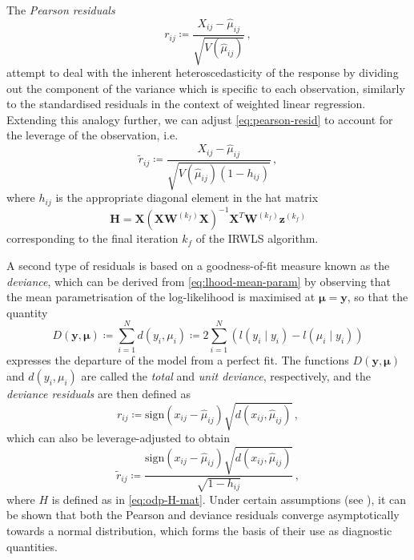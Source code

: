 \documentclass[a4paper]{book}
\begin{document}
The \emph{Pearson residuals}
\begin{equation} \label{eq:pearson-resid}
  r_{ij} \coloneqq \frac{X_{ij} - \widehat{\mu}_{ij}}{\sqrt{V(\widehat{\mu}_{ij})}} \,,
\end{equation}
attempt to deal with the inherent heteroscedasticity of the response by dividing out the component of the variance which is specific to each observation, similarly to the standardised residuals in the context of weighted linear regression. Extending this analogy further, we can adjust \cref{eq:pearson-resid} to account for the leverage of the observation, i.e.\
\begin{equation}
  \tilde{r}_{ij} \coloneqq \frac{X_{ij} - \widehat{\mu}_{ij}}{\sqrt{V(\widehat{\mu}_{ij}) (1 - h_{ij})}} \,,
\end{equation}
where $h_{ij}$ is the appropriate diagonal element in the hat matrix
\begin{equation} \label{eq:odp-H-mat}
  \mathbf{H} = \mathbf{X} (\mathbf{X} \mathbf{W}^{(k_f)} \mathbf{X})^{-1} \mathbf{X}^T \mathbf{W}^{(k_f)} \mathbf{z}^{(k_f)}
\end{equation}
corresponding to the final iteration $k_f$ of the IRWLS algorithm.

A second type of residuals is based on a goodness-of-fit measure known as the \emph{deviance}, which can be derived from \cref{eq:lhood-mean-param} by observing that the mean parametrisation of the log-likelihood is maximised at $\bm{\mu} = \mathbf{y}$, so that the quantity
\begin{equation}
  D(\mathbf{y}, \bm{\mu}) \coloneqq \sum_{i = 1}^N d(y_i, \mu_i) \coloneqq 2 \sum_{i = 1}^N (l(y_i \mid y_i) - l(\widehat{\mu}_i \mid y_i))
\end{equation}
expresses the departure of the model from a perfect fit. The functions $D(\mathbf{y}, \bm{\mu})$ and $d(y_i, \mu_i)$ are called the \emph{total} and \emph{unit deviance}, respectively, and the \emph{deviance residuals} are then defined as
\begin{equation}
  r_{ij} \coloneqq \mathrm{sign}(x_{ij} - \widehat{\mu}_{ij}) \sqrt{d(x_{ij}, \widehat{\mu}_{ij})} \,,
\end{equation}
which can also be leverage-adjusted to obtain
\begin{equation}
  \tilde{r}_{ij} \coloneqq \frac{\mathrm{sign}(x_{ij} - \widehat{\mu}_{ij}) \sqrt{d(x_{ij}, \widehat{\mu}_{ij})}}{\sqrt{1 - h_{ij}}} \,,
\end{equation}
where $H$ is defined as in \cref{eq:odp-H-mat}. Under certain assumptions (see \cite[Section 7.5]{dunn:glm-in-r}), it can be shown that both the Pearson and deviance residuals converge asymptotically towards a normal distribution, which forms the basis of their use as diagnostic quantities.
\end{document}
